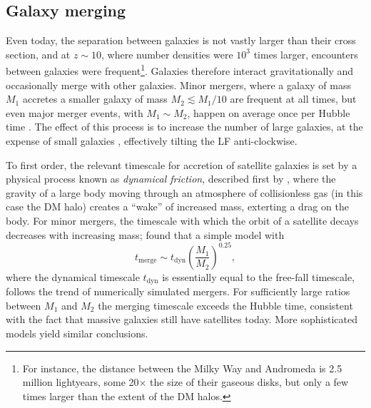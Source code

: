 \documentclass[useAMS]{aa}
\begin{document}
\subsection{Galaxy merging}
\label{sec:merging}

Even today, the separation between galaxies is not vastly larger than their cross section, and at $z\sim10$, where number densities were $10^3$ times larger, encounters between galaxies were frequent\footnote{For instance, the distance between the Milky Way and Andromeda is 2.5 million lightyears, some 20$\times$ the size of their gaseous disks, but only a few times larger than the extent of the DM halos.}.
Galaxies therefore interact gravitationally and occasionally merge with other galaxies.
Minor mergers, where a galaxy of mass $M_1$ accretes a smaller galaxy of mass $M_2 \lesssim M_1/10$ are frequent at all times, but even major merger events, with $M_1\sim M_2$, happen on average once per Hubble time \citep{Lacey1993}.
The effect of this process is to increase the number of large galaxies, at the expense of small galaxies \citep[e.g.][]{Cole1991,Kauffmann1993}, effectively tilting the LF anti-clockwise.

To first order, the relevant timescale for accretion of satellite galaxies is set by a physical process known as \emph{dynamical friction}, described first by \citet{Chandrasekhar1943}, where the gravity of a large body moving through an atmosphere of collisionless gas (in this case the DM halo) creates a ``wake'' of increased mass, exterting a drag on the body.
For minor mergers, the timescale with which the orbit of a satellite decays decreases with increasing mass; \citet{Cole1994} found that a simple model with
\begin{equation}
    \label{eq:tmerge}
    t_\mathrm{merge} \sim t_\mathrm{dyn} \left( \frac{M_1}{M_2} \right)^{0.25},
\end{equation}
where the dynamical timescale $t_\mathrm{dyn}$ is essentially equal to the free-fall timescale, follows the trend of numerically simulated mergers.
For sufficiently large ratios between $M_1$ and $M_2$
the merging timescale exceeds the Hubble time, consistent with the fact that massive galaxies still have satellites today.
More sophisticated models \citep[e.g][]{Boylan-Kolchin2008}
yield similar conclusions.
\end{document}
